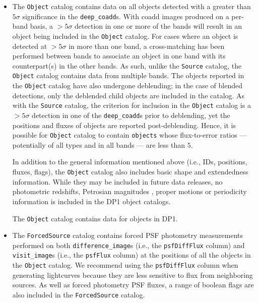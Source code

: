 \begin{itemize}
\item The \texttt{Object} catalog \citep{10.71929/rubin/2570325} contains data on all objects detected with a greater than $5\sigma$ significance in the \texttt{deep\_coadd}s.
With coadd images produced on a per-band basis, a $>5\sigma$ detection in one or more of the bands will result in an object being included in the \texttt{Object} catalog.
For cases where an object is detected at $>5\sigma$ in more than one band, a cross-matching has been performed between bands to associate an object in one band with its counterpart(s) in the other bands.
As such, unlike the \texttt{Source} catalog, the \texttt{Object} catalog contains data from multiple bands. The objects reported in the \texttt{Object} catalog have also undergone deblending; in the case of blended detections, only the deblended child objects are included in the catalog.
As with the \texttt{Source} catalog, the criterion for inclusion in the \texttt{Object} catalog is a $>5\sigma$ detection in one of the \texttt{deep\_coadd}s prior to deblending, yet the positions and fluxes of objects are reported post-deblending. Hence, it is possible for \texttt{Object} catalog to contain \texttt{objects} whose \gls{flux}-to-error ratios --- potentially of all types and in all bands --- are less than $5$.

In addition to the general information mentioned above (i.e., IDs, positions, fluxes, flags), the \texttt{Object} catalog also includes basic \gls{shape} and extendedness information.
While they may be included in future data releases, no photometric redshifts, Petrosian magnitudes \citep{1976ApJ...209L...1P}, proper motions or periodicity information is included in the \gls{DP1} object catalogs.

The \texttt{Object} catalog contains data for \nobjects objects in \gls{DP1}.


\item The \texttt{ForcedSource} catalog \citep{10.71929/rubin/2570327} contains forced \gls{PSF} photometry measurements performed on both \texttt{difference\_image}s (i.e., the \texttt{psfDiffFlux} column) and \texttt{visit\_image}s (i.e., the \texttt{psfFlux} column) at the positions of all the objects in the \texttt{Object} catalog.
We recommend using the \texttt{psfDiffFlux} column when generating lightcurves because they are less sensitive to \gls{flux} from neighboring sources.
As well as \gls{forced photometry} \gls{PSF} fluxes, a range of boolean flags are also included in the \texttt{ForcedSource} catalog.


\end{itemize}
